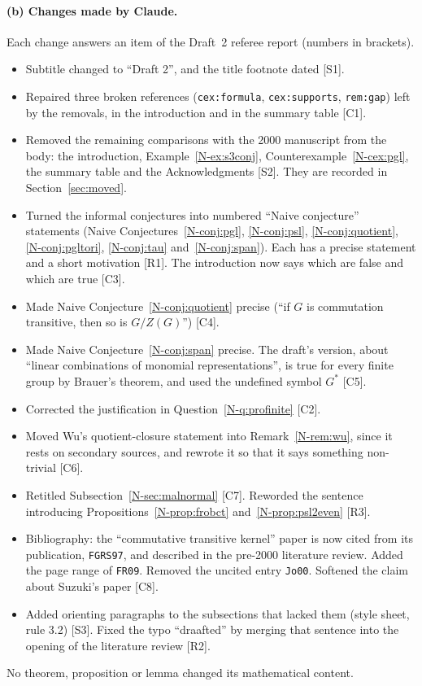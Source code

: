 \documentclass[12pt,letterpaper]{article}
\begin{document}
\paragraph{(b) Changes made by Claude.} Each change answers an item of the
Draft~2 referee report (numbers in brackets).
\begin{itemize}[itemsep=1pt]
\item Subtitle changed to ``Draft 2'', and the title footnote dated
  [S1].
\item Repaired three broken references (\verb|cex:formula|,
  \verb|cex:supports|, \verb|rem:gap|) left by the removals, in the
  introduction and in the summary table [C1].
\item Removed the remaining comparisons with the 2000 manuscript from the
  body: the introduction, Example~\ref{N-ex:s3conj},
  Counterexample~\ref{N-cex:pgl}, the summary table and the
  Acknowledgments [S2]. They are recorded in Section~\ref{sec:moved}.
\item Turned the informal conjectures into numbered ``Naive conjecture''
  statements (Naive Conjectures~\ref{N-conj:pgl}, \ref{N-conj:psl},
  \ref{N-conj:quotient}, \ref{N-conj:pgltori}, \ref{N-conj:tau}
  and~\ref{N-conj:span}). Each has a precise statement and a short motivation
  [R1]. The introduction now says which are false and which are true [C3].
\item Made Naive Conjecture~\ref{N-conj:quotient} precise (``if $G$ is
  commutation transitive, then so is $G/Z(G)$'') [C4].
\item Made Naive Conjecture~\ref{N-conj:span} precise. The draft's version,
  about ``linear combinations of monomial representations'', is true for
  every finite group by Brauer's theorem, and used the undefined symbol
  $G^*$ [C5].
\item Corrected the justification in Question~\ref{N-q:profinite} [C2].
\item Moved Wu's quotient-closure statement into Remark~\ref{N-rem:wu},
  since it rests on secondary sources, and rewrote it so that it says
  something non-trivial [C6].
\item Retitled Subsection~\ref{N-sec:malnormal} [C7]. Reworded the sentence
  introducing Propositions~\ref{N-prop:frobct} and~\ref{N-prop:psl2even}
  [R3].
\item Bibliography: the ``commutative transitive kernel'' paper is now
  cited from its publication, \texttt{FGRS97}, and described in the
  pre-2000 literature review. Added the page range of \texttt{FR09}. Removed
  the uncited entry \texttt{Jo00}. Softened the claim about Suzuki's paper
  [C8].
\item Added orienting paragraphs to the subsections that lacked them (style
  sheet, rule 3.2) [S3]. Fixed the typo ``draafted'' by merging that
  sentence into the opening of the literature review [R2].
\end{itemize}
No theorem, proposition or lemma changed its mathematical content.
\end{document}
